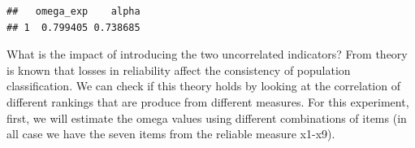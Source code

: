 \documentclass[]{book}
\newenvironment{Shaded}{\begin{snugshade}}{\end{snugshade}}
\newcommand{\DataTypeTok}[1]{\textcolor[rgb]{0.13,0.29,0.53}{#1}}
\newcommand{\DecValTok}[1]{\textcolor[rgb]{0.00,0.00,0.81}{#1}}
\newcommand{\KeywordTok}[1]{\textcolor[rgb]{0.13,0.29,0.53}{\textbf{#1}}}
\newcommand{\NormalTok}[1]{#1}
\newcommand{\OperatorTok}[1]{\textcolor[rgb]{0.81,0.36,0.00}{\textbf{#1}}}
\begin{document}
\begin{verbatim}
##   omega_exp    alpha
## 1  0.799405 0.738685
\end{verbatim}

What is the impact of introducing the two uncorrelated indicators? From theory is known that losses in reliability affect the consistency of population classification. We can check if this theory holds by looking at the correlation of different rankings that are produce from different measures. For this experiment, first, we will estimate the omega values using different combinations of items (in all case we have the seven items from the reliable measure x1-x9).

\begin{Shaded}
\end{Shaded}
\end{document}
